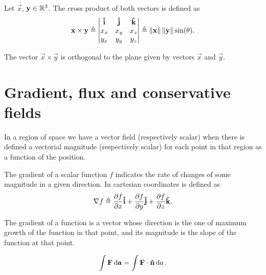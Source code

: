 \begin{defn}
    Let $\vec{x}$, $\vec{y}\in\R^3$. The cross product of both vectors is defined as
    \begin{equation}
        \mathbf{x}\times\mathbf{y}\triangleq\begin{vmatrix}
            \mathbf{\hat{i}} & \mathbf{\hat{j}} & \mathbf{\hat{k}} \\
            x_x & x_y & x_z \\
            y_x & y_y & y_z
        \end{vmatrix} \triangleq\left\Vert \mathbf{x} \right\Vert\left\Vert \mathbf{y} \right\Vert\sin(\theta).
    \end{equation}
\end{defn}

\begin{remark}
    The vector $\vec{x}\times\vec{y}$ is orthogonal to the plane given by vectors $\vec{x}$ and $\vec{y}$.
\end{remark}

\section{Gradient, flux and conservative fields}

In a region of space we have a vector field (respectively scalar) when there is defined a vectorial magnitude (respectively
scalar) for each point in that region as a function of the position.

\begin{defn}[Gradient]
    The gradient of a scalar function $f$ indicates the rate of changes of some magnitude in a given direction. In 
    cartesian coordinates is defined as
    \begin{equation}
        \mathbf{\nabla} f\triangleq \frac{\partial f}{\partial x}\mathbf{\hat{i}} + \frac{\partial f}{\partial y}\mathbf{\hat{j}} + 
        \frac{\partial f}{\partial z}\mathbf{\hat{k}}.
    \end{equation}
\end{defn}

\begin{note}
    The gradient of a function is a vector whose direction is the one of maximum growth of the function in that point, and
    its magnitude is the slope of the function at that point.
\end{note}

\begin{defn}
    \begin{equation}
        \int\mathbf{F}\dd{\mathbf{a}} = \int\mathbf{F}\cdot\mathbf{\hat{n}}\dd{a}.
    \end{equation}
\end{defn}

